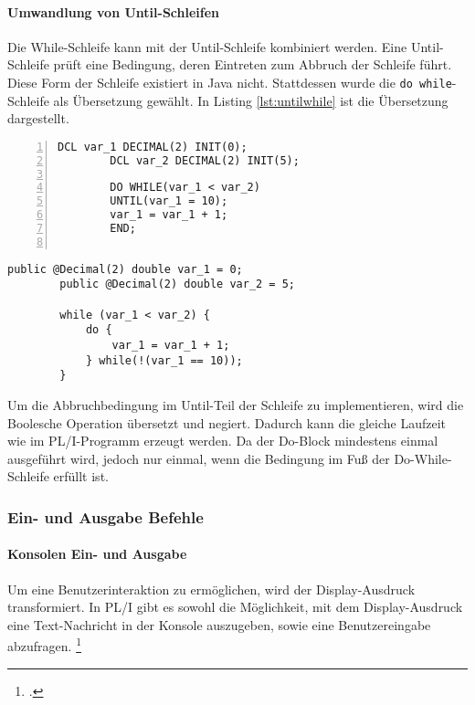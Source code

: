 \pagebreak
\paragraph*{Umwandlung von Until-Schleifen}

Die While-Schleife kann mit der Until-Schleife kombiniert werden. Eine Until-Schleife prüft eine Bedingung, deren Eintreten zum Abbruch der Schleife führt. Diese Form der Schleife existiert in Java nicht. Stattdessen wurde die \verb+do while+-Schleife als Übersetzung gewählt. In Listing \ref{lst:untilwhile} ist die Übersetzung dargestellt.

\begin{minipage}[b]{0.48\linewidth}
	\centering
	\lstset{language=PL/I,label=SliceExaple}
	\begin{lstlisting}[frame=single, numbers=left, mathescape,%
		caption={Transformation Until-Schleife}, label={lst:untilwhile}, basicstyle=\fontsize{9}{13}\selectfont\ttfamily]
		DCL var_1 DECIMAL(2) INIT(0);
		DCL var_2 DECIMAL(2) INIT(5);
		
		DO WHILE(var_1 < var_2) 
		UNTIL(var_1 = 10);
		var_1 = var_1 + 1;
		END;
		
	\end{lstlisting}
\end{minipage}
\hspace{0.5cm}
\begin{minipage}[b]{0.48\linewidth}
	\centering
	\lstset{language=Java,label=SliceExaple}
	\begin{lstlisting}[frame=single, mathescape,%
		title={" "}, basicstyle=\fontsize{9}{13}\selectfont\ttfamily]
		public @Decimal(2) double var_1 = 0;
		public @Decimal(2) double var_2 = 5;
		
		while (var_1 < var_2) {
			do {
				var_1 = var_1 + 1;
			} while(!(var_1 == 10));
		}
	\end{lstlisting}
\end{minipage} 

Um die Abbruchbedingung im Until-Teil der Schleife zu implementieren, wird die Boolesche Operation übersetzt und negiert. Dadurch kann die gleiche Laufzeit wie im PL/I-Programm erzeugt werden. Da der Do-Block mindestens einmal ausgeführt wird, jedoch nur einmal, wenn die Bedingung im Fuß der Do-While-Schleife erfüllt ist.

\subsubsection{Ein- und Ausgabe Befehle}
\paragraph*{Konsolen Ein- und Ausgabe}
Um eine Benutzerinteraktion zu ermöglichen, wird der Display-Ausdruck transformiert.
In PL/I gibt es sowohl die Möglichkeit, mit dem Display-Ausdruck eine Text-Nachricht in der Konsole auszugeben, sowie eine Benutzereingabe abzufragen. \footcite[Vgl. ][S. 264ff.]{pliref}

